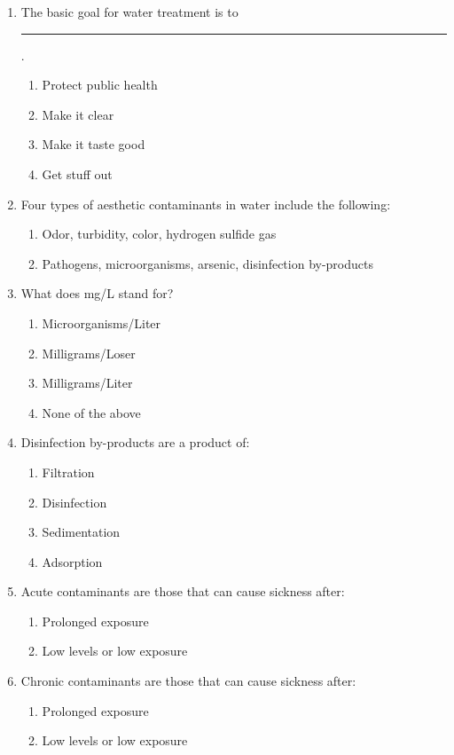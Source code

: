 \begin{enumerate}
\item The basic goal for water treatment is to \rule{1cm}{0.5pt}.
\begin{enumerate}
\item Protect public health
\item Make it clear
\item Make it taste good
\item Get stuff out
\end{enumerate}

\item Four types of aesthetic contaminants in water include the following:
\begin{enumerate}
\item Odor, turbidity, color, hydrogen sulfide gas
\item Pathogens, microorganisms, arsenic, disinfection by-products
\end{enumerate}

\item What does mg/L stand for?
\begin{enumerate}
\item Microorganisms/Liter
\item Milligrams/Loser
\item Milligrams/Liter
\item None of the above
\end{enumerate}

\item Disinfection by-products are a product of:
\begin{enumerate}
\item Filtration
\item Disinfection
\item Sedimentation
\item Adsorption
\end{enumerate}

\item Acute contaminants are those that can cause sickness after:
\begin{enumerate}
\item Prolonged exposure
\item Low levels or low exposure
\end{enumerate}

\item Chronic contaminants are those that can cause sickness after:
\begin{enumerate}
\item Prolonged exposure
\item Low levels or low exposure
\end{enumerate}


\end{enumerate}
